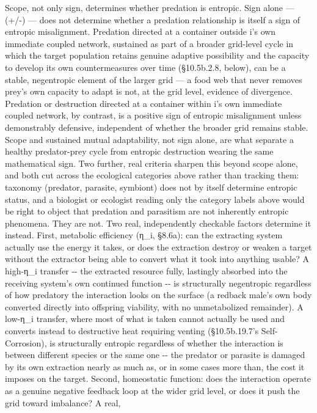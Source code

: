\documentclass[
]{article}
\begin{document}
Scope, not only sign, determines whether predation is entropic. Sign
alone --- (+/-) --- does not determine whether a predation relationship
is itself a sign of entropic misalignment. Predation directed at a
container outside i's own immediate coupled network, sustained as part
of a broader grid-level cycle in which the target population retains
genuine adaptive possibility and the capacity to develop its own
countermeasures over time (§10.5b.2.8, below), can be a stable,
negentropic element of the larger grid --- a food web that never removes
prey's own capacity to adapt is not, at the grid level, evidence of
divergence. Predation or destruction directed at a container within i's
own immediate coupled network, by contrast, is a positive sign of
entropic misalignment unless demonstrably defensive, independent of
whether the broader grid remains stable. Scope and sustained mutual
adaptability, not sign alone, are what separate a healthy predator-prey
cycle from entropic destruction wearing the same mathematical sign. Two
further, real criteria sharpen this beyond scope alone, and both cut
across the ecological categories above rather than tracking them:
taxonomy (predator, parasite, symbiont) does not by itself determine
entropic status, and a biologist or ecologist reading only the category
labels above would be right to object that predation and parasitism are
not inherently entropic phenomena. They are not. Two real, independently
checkable factors determine it instead. First, metabolic efficiency
(η\_i, §8.6a): can the extracting system actually use the energy it
takes, or does the extraction destroy or weaken a target without the
extractor being able to convert what it took into anything usable? A
high-η\_i transfer -\/- the extracted resource fully, lastingly absorbed
into the receiving system's own continued function -\/- is structurally
negentropic regardless of how predatory the interaction looks on the
surface (a redback male's own body converted directly into offspring
viability, with no unmetabolized remainder). A low-η\_i transfer, where
most of what is taken cannot actually be used and converts instead to
destructive heat requiring venting (§10.5b.19.7's Self-Corrosion), is
structurally entropic regardless of whether the interaction is between
different species or the same one -\/- the predator or parasite is
damaged by its own extraction nearly as much as, or in some cases more
than, the cost it imposes on the target. Second, homeostatic function:
does the interaction operate as a genuine negative feedback loop at the
wider grid level, or does it push the grid toward imbalance? A real,
\end{document}
